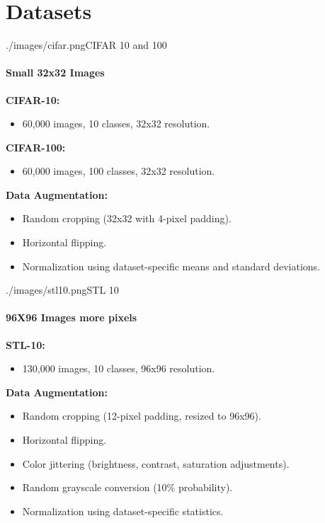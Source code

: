 \section{Datasets}

\begin{sidepic}{./images/cifar.png}{CIFAR 10 and 100}
  \framesubtitle{Small 32x32 Images}
  \textbf{CIFAR-10:}
  \begin{itemize}
    \item 60,000 images, 10 classes, 32x32 resolution.
  \end{itemize}

  \textbf{CIFAR-100:}
  \begin{itemize}
    \item 60,000 images, 100 classes, 32x32 resolution.
  \end{itemize}

  \textbf{Data Augmentation:}
  \begin{itemize}
    \item Random cropping (32x32 with 4-pixel padding).
    \item Horizontal flipping.
    \item Normalization using dataset-specific means and standard deviations.
  \end{itemize}
\end{sidepic}

\begin{sidepic}{./images/stl10.png}{STL 10}
  \framesubtitle{96X96 Images more pixels}
  \textbf{STL-10:}
  \begin{itemize}
    \item 130,000 images, 10 classes, 96x96 resolution.
  \end{itemize}

  \textbf{Data Augmentation:}
  \begin{itemize}
    \item Random cropping (12-pixel padding, resized to 96x96).
    \item Horizontal flipping.
    \item Color jittering (brightness, contrast, saturation adjustments).
    \item Random grayscale conversion (10\% probability).
    \item Normalization using dataset-specific statistics.
  \end{itemize}
\end{sidepic}
